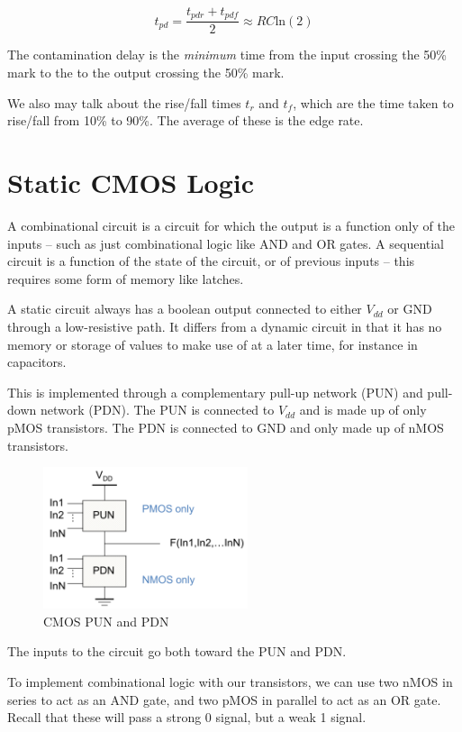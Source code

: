 \documentclass{article}
\begin{document}
\begin{equation}
t_{pd} = \dfrac{t_{pdr} + t_{pdf}}{2} \approx RC\mathrm{ln}(2)
\end{equation}

The contamination delay is the \textit{minimum} time from the input crossing the 50\% mark to the to the output crossing the 50\% mark.

We also may talk about the rise/fall times $t_r$ and $t_f$, which are the time taken to rise/fall from 10\% to 90\%. The average of these is the edge rate.

\section{Static CMOS Logic}

A combinational circuit is a circuit for which the output is a function only of the inputs -- such as just combinational logic like AND and OR gates. A sequential circuit is a function of the state of the circuit, or of previous inputs -- this requires some form of memory like latches. 

A static circuit always has a boolean output connected to either $V_{dd}$ or GND through a low-resistive path. It differs from a dynamic circuit in that it has no memory or storage of values to make use of at a later time, for instance in capacitors.

This is implemented through a complementary pull-up network (PUN) and pull-down network (PDN). The PUN is connected to $V_{dd}$ and is made up of only pMOS transistors. The PDN is connected to GND and only made up of nMOS transistors. 

\begin{figure}[ht!]
\centering
\includegraphics[width=60mm]{CMOS.png}
\caption{CMOS PUN and PDN}
\end{figure}

The inputs to the circuit go both toward the PUN and PDN. 

To implement combinational logic with our transistors, we can use two nMOS in series to act as an AND gate, and two pMOS in parallel to act as an OR gate. Recall that these will pass a strong 0 signal, but a weak 1 signal.
\end{document}
